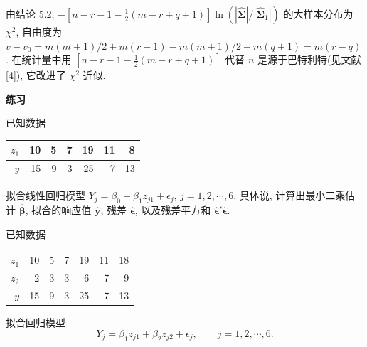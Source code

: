 由结论 5.2, $-\left[n-r-1-\frac{1}{2}(m-r+q+1)\right]\ln(|\hat{\boldsymbol{\Sigma}}|/|\hat{\boldsymbol{\Sigma}}_1|)$ 的大样本分布为 $\chi^2$, 自由度为 $v-v_0=m(m+1)/2+m(r+1)-m(m+1)/2-m(q+1)=m(r-q)$. 在统计量中用 $\left[n-r-1-\frac{1}{2}(m-r+q+1)\right]$ 代替 $n$ 是源于巴特利特(见文献[4]), 它改进了 $\chi^2$ 近似.

\vspace{6pt}
{\large\bfseries 练习}

\medskip
{}\quad 已知数据

\begin{mvtable}
\begin{tabular}{r|rrrrrr}
\hline
$z_1$&10&5&7&19&11&8\\
\hline
$y$&15&9&3&25&7&13\\
\hline
\end{tabular}
\end{mvtable}

拟合线性回归模型 $Y_j=\beta_0+\beta_1z_{j1}+\epsilon_j$, $j=1,2,\cdots,6$. 具体说, 计算出最小二乘估计 $\hat{\boldsymbol{\beta}}$, 拟合的响应值 $\hat{\boldsymbol{y}}$, 残差 $\hat{\boldsymbol{\epsilon}}$, 以及残差平方和 $\hat{\boldsymbol{\epsilon}}'\hat{\boldsymbol{\epsilon}}$.

\quad 已知数据

\begin{mvtable}
\begin{tabular}{r|rrrrrr}
\hline
$z_1$&10&5&7&19&11&18\\
$z_2$&2&3&3&6&7&9\\
\hline
$y$&15&9&3&25&7&13\\
\hline
\end{tabular}
\end{mvtable}

拟合回归模型
\[
Y_j=\beta_1z_{j1}+\beta_2z_{j2}+\epsilon_j,\qquad j=1,2,\cdots,6.
\]
